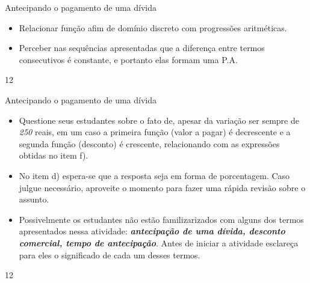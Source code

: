 \clearpage
\def\currentcolor{session2}
\begin{objectives}{Antecipando o pagamento de uma dívida}
{
\begin{itemize}
\item Relacionar função afim de domínio discreto com progressões aritméticas.
\item Perceber nas sequências apresentadas que a diferença entre termos consecutivos é constante, e portanto elas formam uma P.A.
\end{itemize}
}{1}{2}
\end{objectives}
\begin{sugestions}{Antecipando o pagamento de uma dívida}
{
\begin{itemize}
\item Questione seus estudantes sobre o fato de, apesar da variação ser sempre de \textit{250} reais, em um caso a primeira função (valor a pagar) é decrescente e a segunda função (desconto) é crescente, relacionando com as expressões obtidas no item f).
\item No item d) espera-se que a resposta seja em forma de porcentagem. Caso julgue necessário, aproveite o momento para fazer uma rápida revisão sobre o assunto.
\item Possivelmente os estudantes não estão familizarizados com alguns dos termos apresentados nessa atividade: \textit{\textbf{antecipação de uma dívida, desconto comercial, tempo de antecipação}}. Antes de iniciar a atividade esclareça para eles o significado de cada um desses termos.
\end{itemize}
}{1}{2}
\end{sugestions}
